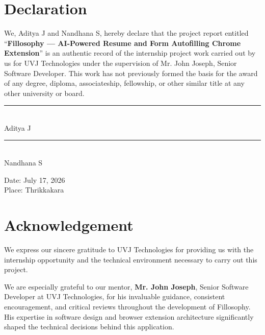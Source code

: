 \documentclass[12pt,a4paper]{report}
\begin{document}
\chapter*{Declaration}
We, Aditya J and Nandhana S, hereby declare that the project report entitled ``\textbf{Fillosophy — AI-Powered Resume and Form Autofilling Chrome Extension}'' is an authentic record of the internship project work carried out by us for UVJ Technologies under the supervision of Mr. John Joseph, Senior Software Developer. This work has not previously formed the basis for the award of any degree, diploma, associateship, fellowship, or other similar title at any other university or board.

\vspace{2cm}

\noindent
\begin{minipage}{0.45\textwidth}
    \begin{center}
        \rule{4cm}{0.4pt}\\
        Aditya J
    \end{center}
\end{minipage}
\hfill
\begin{minipage}{0.45\textwidth}
    \begin{center}
        \rule{4cm}{0.4pt}\\
        Nandhana S
    \end{center}
\end{minipage}

\vspace{1.5cm}
\noindent Date: July 17, 2026 \\
\noindent Place: Thrikkakara

\chapter*{Acknowledgement}
We express our sincere gratitude to UVJ Technologies for providing us with the internship opportunity and the technical environment necessary to carry out this project.

We are especially grateful to our mentor, \textbf{Mr. John Joseph}, Senior Software Developer at UVJ Technologies, for his invaluable guidance, consistent encouragement, and critical reviews throughout the development of Fillosophy. His expertise in software design and browser extension architecture significantly shaped the technical decisions behind this application.
\end{document}
